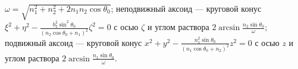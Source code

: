 $\omega = \sqrt{n^2_1 + n^2_2 + 2n_1n_2\cos{\theta _0}}$;
неподвижный аксоид --- круговой конус
$\xi ^2 + \eta ^2 -
\frac{b^2_2 \sin^2{\theta _0}}{(n_2\cos{\theta _0} + n_1)^2}\zeta ^2 = 0$
с осью $\zeta$ и углом раствора $2\arcsin{\frac{n_2\sin{\theta _0}}{\omega}}$;
подвижный аксоид --- круговой конус
$x^2 + y^2 - \frac{n^2_1 \sin{\theta _0}}{(n_1\cos{\theta _0} + n_2)^2}z^2 = 0$
с осью $z$ и углом раствора $2\arcsin{\frac{n_1\sin{\theta _0}}{\omega}}$.
